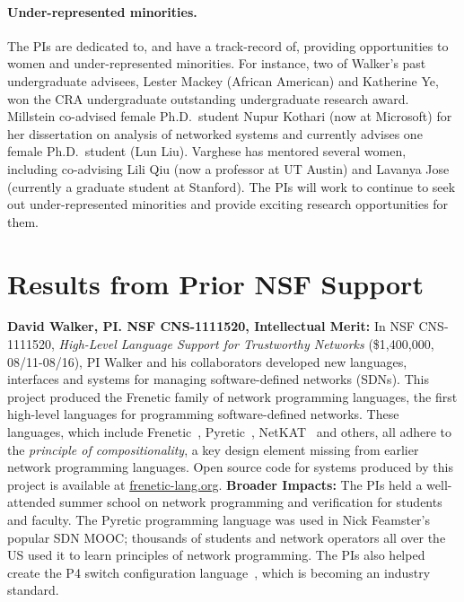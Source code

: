 \paragraph*{Under-represented minorities.} The PIs are dedicated
to, and have a track-record of, providing opportunities to women and under-represented 
minorities.  For instance, two of Walker's past undergraduate advisees,
Lester Mackey (African American) and Katherine Ye, won the CRA undergraduate 
outstanding undergraduate
research award.
Millstein co-advised female Ph.D.\ student Nupur Kothari (now at Microsoft) for her dissertation on analysis of networked systems and currently advises one female Ph.D.\ student (Lun Liu).  Varghese has mentored several women, including
co-advising Lili Qiu (now a professor at UT Austin) and Lavanya Jose (currently a graduate student at Stanford).
The PIs will work to continue to seek out under-represented minorities and provide exciting 
research opportunities for them.

\section{Results from Prior NSF Support}
\label{sec:prior-support}

\noindent
{\bf David Walker, PI. NSF CNS-1111520, Intellectual Merit:}
In NSF CNS-1111520, \emph{High-Level Language Support for Trustworthy Networks}
(\$1,400,000, 08/11-08/16),
PI Walker and his collaborators developed new languages, interfaces
and systems for managing software-defined networks (SDNs).  
This project produced the Frenetic family
of network programming languages, the first high-level languages for
programming software-defined networks.  These languages, which include
Frenetic~\cite{frenetic}, 
Pyretic~\cite{pyretic},
NetKAT~\cite{netkat} and others, all adhere to the
\emph{principle of compositionality}, a key design element missing
from earlier network programming languages.  
Open source code for systems produced by this project is available
at \url{frenetic-lang.org}.
%
{\bf Broader Impacts:} 
The PIs held a well-attended summer school on network programming and 
verification for students and faculty. The
Pyretic programming language was used in Nick Feamster's popular
SDN MOOC; thousands of students and
network operators all over the US used it to learn principles of network
programming.  The PIs
also helped create the P4 switch configuration language~\cite{P4}, which is
becoming an industry standard.

